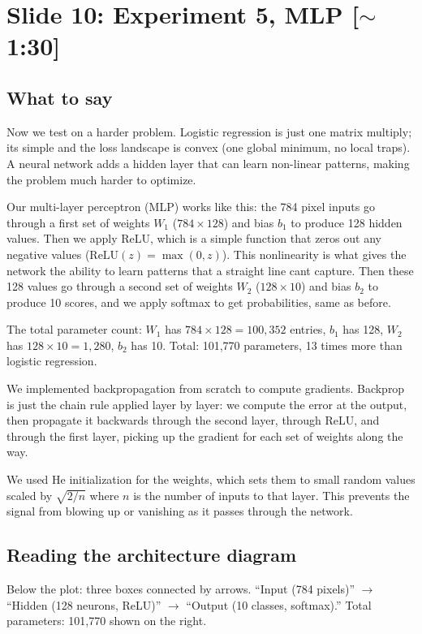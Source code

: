 \documentclass[11pt, letterpaper]{article}
\begin{document}
\section{Slide 10: Experiment 5, MLP \textnormal{\color{muted}[$\sim$1:30]}}

\subsection{What to say}

Now we test on a harder problem. Logistic regression is just one matrix multiply; its simple and the loss landscape is convex (one global minimum, no local traps). A neural network adds a hidden layer that can learn non-linear patterns, making the problem much harder to optimize.

Our multi-layer perceptron (MLP) works like this: the 784 pixel inputs go through a first set of weights $W_1$ ($784 \times 128$) and bias $b_1$ to produce 128 hidden values. Then we apply ReLU, which is a simple function that zeros out any negative values ($\text{ReLU}(z) = \max(0, z)$). This nonlinearity is what gives the network the ability to learn patterns that a straight line cant capture. Then these 128 values go through a second set of weights $W_2$ ($128 \times 10$) and bias $b_2$ to produce 10 scores, and we apply softmax to get probabilities, same as before.

The total parameter count: $W_1$ has $784 \times 128 = 100{,}352$ entries, $b_1$ has 128, $W_2$ has $128 \times 10 = 1{,}280$, $b_2$ has 10. Total: 101,770 parameters, 13 times more than logistic regression.

We implemented backpropagation from scratch to compute gradients. Backprop is just the chain rule applied layer by layer: we compute the error at the output, then propagate it backwards through the second layer, through ReLU, and through the first layer, picking up the gradient for each set of weights along the way.

We used He initialization for the weights, which sets them to small random values scaled by $\sqrt{2/n}$ where $n$ is the number of inputs to that layer. This prevents the signal from blowing up or vanishing as it passes through the network.

\subsection{Reading the architecture diagram}
Below the plot: three boxes connected by arrows. ``Input (784 pixels)'' $\to$ ``Hidden (128 neurons, ReLU)'' $\to$ ``Output (10 classes, softmax).'' Total parameters: 101,770 shown on the right.
\end{document}
